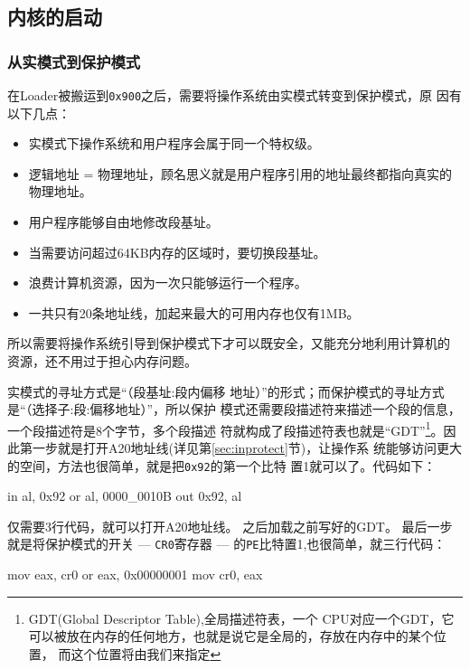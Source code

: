 \subsection{内核的启动}
\label{sec:kernel}

\subsubsection{从实模式到保护模式}
\label{subsec:protect}

在Loader被搬运到\texttt{0x900}之后，需要将操作系统由实模式转变到保护模式\cite{LWY2013}，原
因有以下几点：
\begin{itemize}
\item 实模式下操作系统和用户程序会属于同一个特权级。
\item 逻辑地址 = 物理地址，顾名思义就是用户程序引用的地址最终都指向真实的物理地址。
\item 用户程序能够自由地修改段基址。
\item 当需要访问超过64KB内存的区域时，要切换段基址。
\item 浪费计算机资源，因为一次只能够运行一个程序。
\item 一共只有20条地址线，加起来最大的可用内存也仅有1MB。
\end{itemize}

所以需要将操作系统引导到保护模式下才可以既安全，又能充分地利用计算机的
资源，还不用过于担心内存问题。

实模式的寻址方式是“（段基址:段内偏移
地址）”的形式；而保护模式的寻址方式是“（选择子:段:偏移地址）”，所以保护
模式还需要段描述符来描述一个段的信息，一个段描述符是8个字节，多个段描述
符就构成了段描述符表也就是“GDT”\footnote{GDT(Global Descriptor Table)\cite{chxs2012},全局描述符表，一个
  CPU对应一个GDT，它可以被放在内存的任何地方，也就是说它是全局的，存放在内存中的某个位置，
  而这个位置将由我们来指定}。因此第一步就是打开A20地址线(详见第\ref{sec:inprotect}节)，让操作系
统能够访问更大的空间，方法也很简单，就是把\texttt{0x92}的第一个比特
置1就可以了。代码如下：
\begin{codeblock}
\begin{nasmcode}
in al, 0x92
or al, 0000_0010B
out 0x92, al
\end{nasmcode}  
\end{codeblock}
仅需要3行代码，就可以打开A20地址线。
之后加载之前写好的GDT。
最后一步就是将保护模式的开关 --- \texttt{CR0}寄存器 --- 的\texttt{PE}比特置1,也很简单，就三行代码：

\begin{codeblock}
\begin{nasmcode}
mov eax, cr0
or  eax, 0x00000001
mov cr0, eax
\end{nasmcode}  
\end{codeblock}

